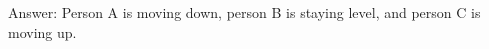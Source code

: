 \documentclass[preview]{standalone}
\begin{document}
\begin{center}
Answer: Person A is moving down, person B is staying level, and person C is moving up.
\end{center}
\end{document}
